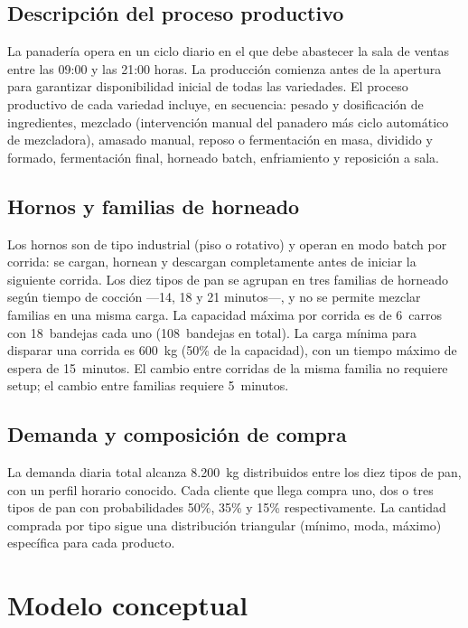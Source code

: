 \documentclass[12pt]{article}
\begin{document}
\subsection{Descripción del proceso productivo}

La panadería opera en un ciclo diario en el que debe abastecer la sala de ventas entre las 09:00 y las 21:00 horas. La producción comienza antes de la apertura para garantizar disponibilidad inicial de todas las variedades. El proceso productivo de cada variedad incluye, en secuencia: pesado y dosificación de ingredientes, mezclado (intervención manual del panadero más ciclo automático de mezcladora), amasado manual, reposo o fermentación en masa, dividido y formado, fermentación final, horneado batch, enfriamiento y reposición a sala.

\subsection{Hornos y familias de horneado}

Los hornos son de tipo industrial (piso o rotativo) y operan en modo batch por corrida: se cargan, hornean y descargan completamente antes de iniciar la siguiente corrida. Los diez tipos de pan se agrupan en tres familias de horneado según tiempo de cocción ---14, 18 y 21 minutos---, y no se permite mezclar familias en una misma carga. La capacidad máxima por corrida es de 6~carros con 18~bandejas cada uno (108~bandejas en total). La carga mínima para disparar una corrida es 600~kg (50\% de la capacidad), con un tiempo máximo de espera de 15~minutos. El cambio entre corridas de la misma familia no requiere setup; el cambio entre familias requiere 5~minutos.

\subsection{Demanda y composición de compra}

La demanda diaria total alcanza 8.200~kg distribuidos entre los diez tipos de pan, con un perfil horario conocido. Cada cliente que llega compra uno, dos o tres tipos de pan con probabilidades 50\%, 35\% y 15\% respectivamente. La cantidad comprada por tipo sigue una distribución triangular (mínimo, moda, máximo) específica para cada producto.

\newpage
\section{Modelo conceptual}
\end{document}
